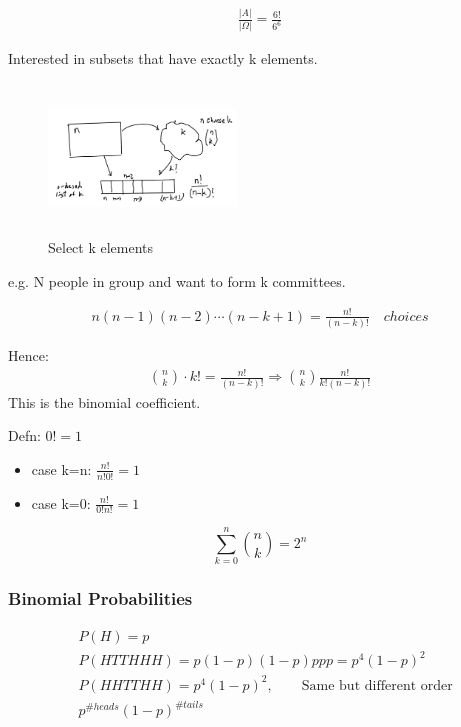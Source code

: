 \begin{align*}
\frac{|A|}{|\Omega|} = \frac{6!}{6^6}
\end{align*}


Interested in subsets that have exactly k elements.

\begin{figure}[ht]
\centering
\includegraphics[width=5cm, height=4cm]{images/L04/sel_k_elems.jpeg}
\caption{Select k elements}
\end{figure}

e.g. N people in group and want to form k committees.

\begin{align*}
n(n-1)(n-2)\cdots (n-k+1)=\frac{n!}{(n-k)!} \quad choices
\end{align*}


Hence:
\begin{align*}
{n \choose k}\cdot k! = \frac{n!}{(n-k)!} \Rightarrow {n \choose k} \frac{n!}{k!(n-k)!}
\end{align*}
This is the binomial coefficient.


Defn: $0! = 1$

\begin{itemize}
    \item case k=n: $\frac{n!}{n!0!}=1$
    \item case k=0: $\frac{n!}{0!n!}=1$ 
\end{itemize}



$$\sum_{k=0}^n {n \choose k} = 2^n$$ 

\subsubsection{Binomial Probabilities}


\begin{align*}
&P(H)=p\\
&P(HTTHHH)=p(1-p)(1-p)ppp = p^4(1-p)^2\\
&P(HHTTHH)= p^4(1-p)^2, \qquad \text{Same but different order}\\
&p^{\#heads}(1-p)^{\#tails}
\end{align*}


